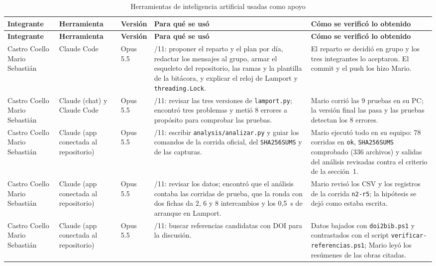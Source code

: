 {\footnotesize
\begin{longtable}{@{}>{\raggedright\arraybackslash}p{2.2cm}>{\raggedright\arraybackslash}p{2.2cm}>{\raggedright\arraybackslash}p{1.6cm}>{\raggedright\arraybackslash}p{3.9cm}>{\raggedright\arraybackslash}p{3.9cm}@{}}
  \caption{Herramientas de inteligencia artificial usadas como apoyo}
  \label{tab:declaracion-ia} \\
  \toprule
  \textbf{Integrante} & \textbf{Herramienta} & \textbf{Versión} & \textbf{Para qué se usó} & \textbf{Cómo se verificó lo obtenido} \\
  \midrule
  \endfirsthead
  \toprule
  \textbf{Integrante} & \textbf{Herramienta} & \textbf{Versión} & \textbf{Para qué se usó} & \textbf{Cómo se verificó lo obtenido} \\
  \midrule
  \endhead
  Castro Coello Mario Sebastián & Claude Code & Opus 5.5 & 18/11: proponer el reparto y el plan por día, redactar los mensajes al grupo, armar el esqueleto del repositorio, las ramas y la plantilla de la bitácora, y explicar el reloj de Lamport y \texttt{threading.Lock}. & El reparto se decidió en grupo y los tres integrantes lo aceptaron. El commit y el push los hizo Mario. \\
  \midrule
  Castro Coello Mario Sebastián & Claude (chat) y Claude Code & Opus 5.5 & 20/11: revisar las tres versiones de \texttt{lamport.py}; encontró tres problemas y metió 8 errores a propósito para comprobar las pruebas. & Mario corrió las 9 pruebas en su PC; la versión final las pasa y las pruebas detectan los 8 errores. \\
  \midrule
  Castro Coello Mario Sebastián & Claude (app conectada al repositorio) & Opus 5.5 & 22/11: escribir \texttt{analysis/analizar.py} y guiar los comandos de la corrida oficial, del \texttt{SHA256SUMS} y de las capturas. & Mario ejecutó todo en su equipo: 78 corridas en \texttt{ok}, \texttt{SHA256SUMS} comprobado (336 archivos) y salidas del análisis revisadas contra el criterio de la sección~1. \\
  \midrule
  Castro Coello Mario Sebastián & Claude (app conectada al repositorio) & Opus 5.5 & 22/11: revisar los datos; encontró que el análisis contaba las corridas de prueba, que la ronda con dos fichas da 2, 6 y 8 intercambios y los 0,5~s de arranque en Lamport. & Mario revisó los CSV y los registros de la corrida \texttt{n2-r5}; la hipótesis se dejó como estaba escrita. \\
  \midrule
  Castro Coello Mario Sebastián & Claude (app conectada al repositorio) & Opus 5.5 & 22/11: buscar referencias candidatas con DOI para la discusión. & Datos bajados con \texttt{doi2bib.ps1} y contrastados con el script \texttt{verificar-\allowbreak referencias.ps1}; Mario leyó los resúmenes de las obras citadas. \\

\end{longtable}}
